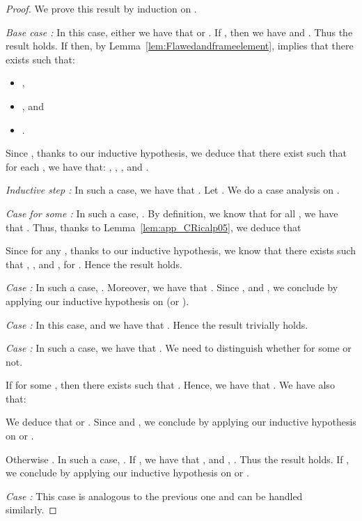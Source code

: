 \begin{proof}
 We prove this result by induction on .

\smallskip{}


 \noindent\emph{Base case :} In this case, either we
 have that  or . If , then we have
  and . Thus the result holds. If 
then, by Lemma~\ref{lem:Flawedandframeelement},
 implies that 
there exists  such that:
\begin{itemize}
\item  , 
\item , and 
\item .
\end{itemize} 
Since , thanks to
 our inductive hypothesis, we  deduce that there exist 
 such that for each , we have that:
, ,
 , and 
.

 \medskip

 \noindent \emph{Inductive step :} In such a case, we have that . Let . We do a case analysis on .

\smallskip{}

 \emph{Case  for some :} In such a  case, . By definition, we know that for all , we have that . Thus, thanks to Lemma~\ref{lem:app_CRicalp05}, we 
 deduce that 
 
Since  for any , thanks to our inductive hypothesis, we know that there exists  such that , ,  and , for
 . Hence the result holds.

\smallskip{}

 \emph{Case :} In such a case, . Moreover, we have
 that 
. Since ,  and
 , we
 conclude by applying our inductive hypothesis on  (or ).

\smallskip{}

 \emph{Case :} In this case,  and we have
 that . Hence the result trivially holds.

\smallskip{}
 
 \emph{Case :} In such a case, we
 have that
 . We need
 to distinguish whether  for
 some  or not.

 If  for some ,  then there exists  such that . Hence, we have that . We have also that:

 We deduce that  or . Since  and ,
 we conclude by applying our inductive hypothesis on  or .

 Otherwise . In such a
 case, . If , we have that ,  and , . Thus the result
 holds. If , we conclude by applying our inductive
 hypothesis on  or .


\smallskip{}

 \emph{Case :} This case is analogous to the previous one and can
 be handled similarly.



\end{proof}
